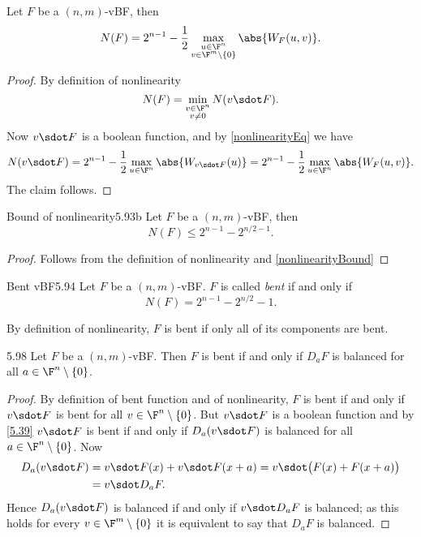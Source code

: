\begin{pr}
	Let \(F\) be a \((n,m)\)-vBF, then
	\[
		N(F) = 2^{n-1}-\frac{1}{2}\max_{\substack{u\in\F^n\\v\in\F^m\setminus\{0\}}}\abs{W_F(u,v)}.
	\]
\end{pr}

\begin{proof}
	By definition of nonlinearity
	\[
		N(F) = \min_{\substack{v \in \F^n\\v\neq 0}}N(v\sdot F).
	\]
	Now \(v\sdot F\) is a boolean function, and by \autoref{nonlinearityEq} we have
	\[
		N(v\sdot F) = 2^{n-1}-\frac{1}{2}\max_{u\in\F^n}\abs{W_{v\sdot F}(u)} = 2^{n-1}-\frac{1}{2}\max_{u\in\F^n}\abs{W_F(u,v)}.
	\]
	The claim follows.
\end{proof}

\begin{teor}{Bound of nonlinearity}{5.93b}
	Let \(F\) be a \((n,m)\)-vBF, then
	\[
		N(F) \le 2^{n-1}-2^{n/2-1}.
	\]
\end{teor}

\begin{proof}
	Follows from the definition of nonlinearity and \autoref{nonlinearityBound}
\end{proof}

\begin{defn}{Bent vBF}{5.94}
	Let \(F\) be a \((n,m)\)-vBF. \(F\) is called \emph{bent} if and only if
	\[
		N(F) = 2^{n-1}-2^{n/2}-1.
	\]
\end{defn}

\begin{oss}
	By definition of nonlinearity, \(F\) is bent if only all of its components are bent.
\end{oss}

\begin{prop}{}{5.98}
	Let \(F\) be a \((n,m)\)-vBF. Then \(F\) is bent if and only if \(D_a F\) is balanced for all \(a \in \F^n\setminus\{0\}\).
\end{prop}

\begin{proof}
	By definition of bent function and of nonlinearity, \(F\) is bent if and only if \(v\sdot F\) is bent for all \(v\in\F^n\setminus\{0\}\). But \(v\sdot F\) is a boolean function and by \autoref{5.39} \(v\sdot F\) is bent if and only if \(D_a(v\sdot F)\) is balanced for all \(a \in \F^n\setminus\{0\}\). Now
	\begin{align*}
		D_a(v\sdot F) & = v\sdot F(x) + v\sdot F(x+a) = v\sdot \big(F(x)+F(x+a)\big) \\
		              & = v\sdot D_a F.
	\end{align*}
	Hence \(D_a(v\sdot F)\) is balanced if and only if \(v\sdot D_a F\) is balanced; as this holds for every \(v\in\F^m\setminus\{0\}\) it is equivalent to say that \(D_a F\) is balanced.
\end{proof}

